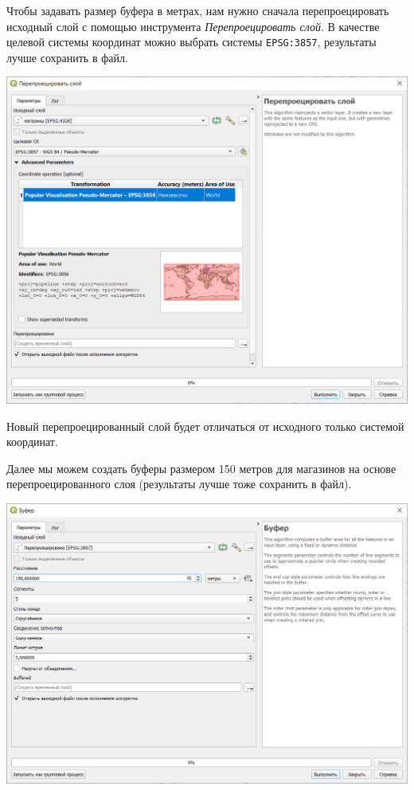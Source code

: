 \documentclass[
]{book}
\begin{document}
Чтобы задавать размер буфера в метрах, нам нужно сначала перепроецировать исходный слой с помощью инструмента \emph{Перепроецировать слой}. В качестве целевой системы координат можно выбрать системы \texttt{EPSG:3857}, результаты лучше сохранить в файл.

\includegraphics{figures/45.png}

Новый перепроецированный слой будет отличаться от исходного только системой координат.

Далее мы можем создать буферы размером 150 метров для магазинов на основе перепроецированного слоя (результаты лучше тоже сохранить в файл).

\includegraphics{figures/46.png}
\end{document}
